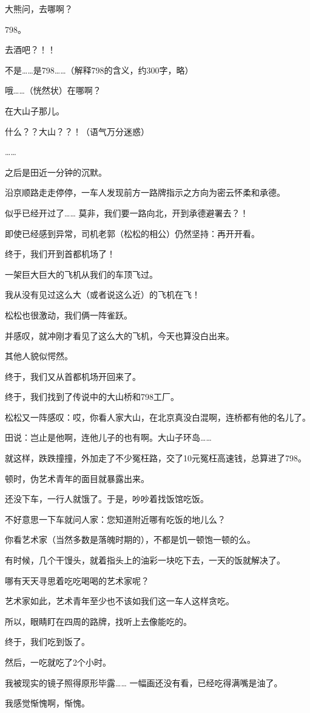 \documentclass[12pt,a4paper]{article}
\begin{document}
		大熊问，去哪啊？\par
		798。\par
		去酒吧？！！\par
		不是……是798……（解释798的含义，约300字，略）\par
		哦……（恍然状）在哪啊？\par
		在大山子那儿。\par
		什么？？大山？？！（语气万分迷惑）\par
		……\par
		之后是田近一分钟的沉默。


		沿京顺路走走停停，一车人发现前方一路牌指示之方向为密云怀柔和承德。\par
		似乎已经开过了…… 莫非，我们要一路向北，开到承德避署去？！\par
		即使已经感到异常，司机老郭（松松的相公）仍然坚持：再开开看。\par
		终于，我们开到首都机场了！\par
		一架巨大巨大的飞机从我们的车顶飞过。\par
		我从没有见过这么大（或者说这么近）的飞机在飞！\par
		松松也很激动，我们俩一阵雀跃。\par
		并感叹，就冲刚才看见了这么大的飞机，今天也算没白出来。\par
		其他人貌似愕然。\par
		终于，我们又从首都机场开回来了。\par
		终于，我们找到了传说中的大山桥和798工厂。\par
		松松又一阵感叹：哎，你看人家大山，在北京真没白混啊，连桥都有他的名儿了。\par
		田说：岂止是他啊，连他儿子的也有啊。大山子环岛……


		就这样，跌跌撞撞，外加走了不少冤枉路，交了10元冤枉高速钱，总算进了798。\par
		顿时，伪艺术青年的面目就暴露出来。\par
		还没下车，一行人就饿了。于是，吵吵着找饭馆吃饭。\par
		不好意思一下车就问人家：您知道附近哪有吃饭的地儿么？\par
		你看艺术家（当然多数是落魄时期的），不都是饥一顿饱一顿的么。\par
		有时候，几个干馒头，就着指头上的油彩一块吃下去，一天的饭就解决了。\par
		哪有天天寻思着吃吃喝喝的艺术家呢？\par
		艺术家如此，艺术青年至少也不该如我们这一车人这样贪吃。\par
		所以，眼睛盯在四周的路牌，找听上去像能吃的。\par
		终于，我们吃到饭了。\par
		然后，一吃就吃了2个小时。\par
		我被现实的镜子照得原形毕露…… 一幅画还没有看，已经吃得满嘴是油了。\par
		我感觉惭愧啊，惭愧。
\end{document}
